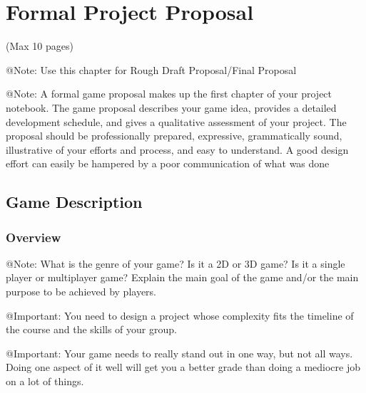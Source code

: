 \chapter{Formal Project Proposal}

\begin{TempText}
	(Max 10 pages)
\end{TempText}

\begin{TempText}
	@Note: Use this chapter for Rough Draft Proposal/Final Proposal 
\end{TempText}

\begin{TempText}
	@Note: A formal game proposal makes up the first chapter of your project notebook. The game proposal describes your game idea, provides a detailed development schedule, and gives a qualitative assessment of your project. The proposal should be professionally prepared, expressive, grammatically sound, illustrative of your efforts and process, and easy to understand. A good design effort can easily be hampered by a poor communication of what was done	
\end{TempText}


\section{Game Description}

\subsection{Overview}

\begin{TempText}
	@Note: What is the genre of your game? Is it a 2D or 3D game? Is it a single player or multiplayer game? Explain the main goal of the game and/or the main purpose to be achieved by players. 
\end{TempText}

\begin{TempText}
	@Important: You need to design a project whose complexity fits the timeline of the course and the skills of your group.
\end{TempText}

\begin{TempText}
	@Important: Your game needs to really stand out in one way, but not all ways. Doing one aspect of it well will get you a better grade than doing a mediocre job on a lot of things.
\end{TempText}

